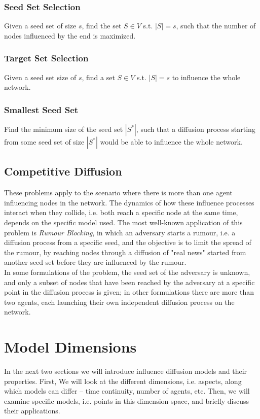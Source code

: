 \documentclass[twocolumn, 10pt]{article}
\begin{document}
\subsubsection{Seed Set Selection}
Given a seed set of size $s$, find the set $S \in V$ s.t. $|S| = s$, such that the number of nodes influenced by the end is maximized.
\subsubsection{Target Set Selection}
Given a seed set size of $s$, find a set $S \in V$ s.t. $|S| = s$ to influence the whole network.
\subsubsection {Smallest Seed Set}
Find the minimum size of the seed set $|S^*|$, such that a diffusion process starting from some seed set of size $|S^*|$ would be able to influence the whole network.
\subsection{Competitive Diffusion}
These problems apply to the scenario where there is more than one agent influencing nodes in the network. The dynamics of how these influence processes interact when they collide, i.e. both reach a specific node at the same time, depends on the specific model used. The most well-known application of this problem is \textit{Rumour Blocking}, in which an adversary starts a rumour, i.e. a diffusion process from a specific seed, and the objective is to limit the spread of the rumour, by reaching nodes through a diffusion of "real news" started from another seed set before they are influenced by the rumour. \\
In some formulations of the problem, the seed set of the adversary is unknown, and only a subset of nodes that have been reached by the adversary at a specific point in the diffusion process is given; in other formulations there are more than two agents, each launching their own independent diffusion process on the network.

\section{Model Dimensions}
In the next two sections we will introduce influence diffusion models and their properties. First, We will look at the different dimensions, i.e. aspects, along which models can differ -- time continuity, number of agents, etc. Then, we will examine specific models, i.e. points in this dimension-space, and briefly discuss their applications.
\end{document}
